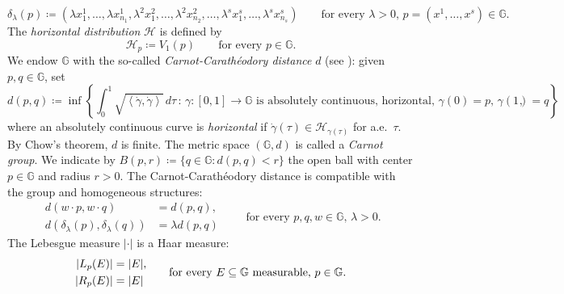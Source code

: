 \documentclass[11pt]{amsart}
\newcommand{\hhh}{{\mathcal{H}}}
\newcommand{\rr}{\mathbb R}
\DeclarePairedDelimiter{\abs}{\lvert}{\rvert}
\theoremstyle{plain}
\theoremstyle{definition}
\theoremstyle{remark}
\numberwithin{equation}{section}
\begin{document}
\begin{equation*}
\delta_\lambda(p) \coloneqq \left(\lambda x^1_1,\dots,\lambda x^1_{n_1}, \lambda^2 x^2_1,\dots,\lambda^2 x^2_{n_2},\dots,\lambda^s x^s_1,\dots,\lambda^s x^s_{n_s}\right) \qquad \text{for every $\lambda>0, \, p=\left(x^1,\dots,x^s\right) \in \mathbb{G}$.}
\end{equation*}
The \emph{horizontal distribution} $\hhh$ is defined by
\begin{equation*}
\hhh_p \coloneqq V_1(p) \qquad \text{for every $p\in \mathbb{G}$.}
\end{equation*}
We endow $\mathbb{G}$ with the so-called \emph{Carnot-Carathéodory distance} $d$ (see \cite{MR3587666}): given $p,q\in\mathbb{G}$, set
\begin{equation*}
    d(p,q) \coloneqq \inf\left\{\int_0^1\sqrt{\left\langle\dot\gamma,\dot\gamma\right\rangle}\,d\tau\,:\, \gamma:[0,1]\to\mathbb{G}\text{ is absolutely continuous, horizontal, } \gamma(0)=p,\,\gamma(1)=q\right\},
\end{equation*}
where an absolutely continuous curve is \emph{horizontal} if $\dot\gamma(\tau)\in\hhh_{\gamma(\tau)}$ for a.e.~$\tau$. By Chow's theorem, $d$ is finite. The metric space $(\mathbb{G},d)$ is called a \emph{Carnot group}. We indicate by $B(p,r) \coloneqq \{q \in\mathbb{G} : d(p,q)<r\}$ the open ball with center $p \in \mathbb{G}$ and radius $r>0$.
The Carnot-Carathéodory distance is compatible with the group and homogeneous structures:
\begin{equation*} 
\begin{split}
    d(w \cdot p, w \cdot q) & = d(p,q),\\
    d(\delta_\lambda(p),\delta_\lambda(q)) & = \lambda d(p,q)
\end{split}
\qquad \text{for every $p,q,w \in \mathbb{G},\,\lambda>0$.}
\end{equation*}
The Lebesgue measure $|\cdot|$ is a Haar measure:
\begin{equation} \label{eq_Lebesgue_Haar}
\begin{split}
    \abs*{L_p(E)}&=\abs*{E},\\
    \abs*{R_p(E)}&=\abs*{E}
\end{split}
\qquad \text{for every $E \subseteq\mathbb{G}$ measurable, $p \in\mathbb{G}$.}
\end{equation}
\end{document}
